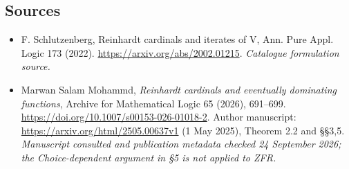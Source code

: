 \documentclass[11pt]{article}
\begin{document}
\subsection{Sources}
\begin{itemize}\raggedright
\item[\textnormal{[S1]}]\hypertarget{source:1357:1}{} F. Schlutzenberg, Reinhardt cardinals and iterates of V, Ann. Pure Appl. Logic 173 (2022).
\url{https://arxiv.org/abs/2002.01215}.
{\small\textit{Catalogue formulation source.}}
\item[\textnormal{[E1]}]\hypertarget{extra:1357:1}{} Marwan Salam Mohammd,
\emph{Reinhardt cardinals and eventually dominating functions},
Archive for Mathematical Logic 65 (2026), 691--699.
\url{https://doi.org/10.1007/s00153-026-01018-2}.
Author manuscript: \url{https://arxiv.org/html/2505.00637v1} (1 May 2025),
Theorem 2.2 and \S\S3,5.
{\small\textit{Manuscript consulted and publication metadata checked
24 September 2026; the Choice-dependent argument in \S5 is not applied to ZFR.}}
\end{itemize}
\end{document}
